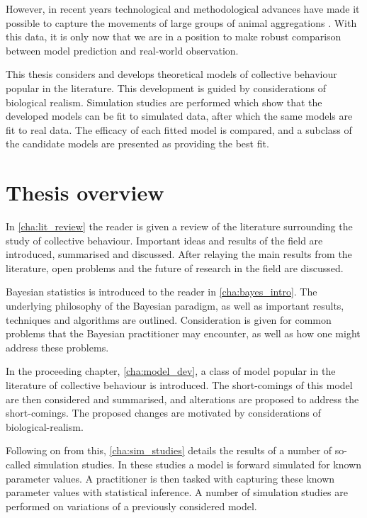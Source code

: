 However, in recent years technological and methodological advances have made it
possible to capture the movements of large groups of animal aggregations
\parencite{ballerini08}. With this data, it is only now that we are in a
position to make robust comparison between model prediction and real-world
observation.

This thesis considers and develops theoretical models of collective behaviour
popular in the literature. This development is guided by considerations of
biological realism. Simulation studies are performed which show that the
developed models can be fit to simulated data, after which the same models are
fit to real data. The efficacy of each fitted model is compared, and a subclass
of the candidate models are presented as providing the best fit.

\section{Thesis overview}
\label{sec:overview_of_thesis}

In \cref{cha:lit_review} the reader is given a review of the literature
surrounding the study of collective behaviour. Important ideas and results of
the field are introduced, summarised and discussed. After relaying the main
results from the literature, open problems and the future of research
in the field are discussed.

Bayesian statistics is introduced to the reader in \cref{cha:bayes_intro}. The
underlying philosophy of the Bayesian paradigm, as well as important results,
techniques and algorithms are outlined. Consideration is given for common
problems that the Bayesian practitioner may encounter, as well as how one might
address these problems.

In the proceeding chapter, \cref{cha:model_dev}, a class of model popular in
the literature of collective behaviour is introduced. The short-comings of this
model are then considered and summarised, and alterations are proposed to
address the short-comings. The proposed changes are motivated by considerations
of biological-realism.

Following on from this, \cref{cha:sim_studies} details the results of a number
of so-called simulation studies. In these studies a model is forward simulated
for known parameter values. A practitioner is then tasked with capturing these
known parameter values with statistical inference. A number of simulation
studies are performed on variations of a previously considered model.

